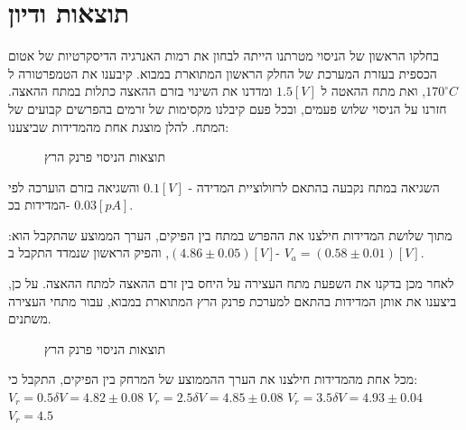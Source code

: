 \documentclass{article}
\begin{document}
\section{תוצאות ודיון}
בחלקו הראשון של הניסוי מטרתנו הייתה לבחון את רמות האנרגיה הדיסקרטיות של אטום הכספית בעזרת המערכת של החלק הראשון המתוארת במבוא.
קיבענו את הטמפרטורה ל
$170 ^{\circ} C$,
ואת מתח ההאטה ל
$1.5 [V]$
ומדדנו את השינוי בזרם ההאצה כתלות במתח ההאצה.
חזרנו על הניסוי שלוש פעמים, ובכל פעם קיבלנו מקסימות של זרמים בהפרשים קבועים של המתח.
להלן מוצגת אחת מהמדידות שביצענו:
 
\begin{figure}[H]
	\begin{center}
	\resizebox{\textwidth}{!}{}
	\end{center}
	\caption{תוצאות הניסוי פרנק הרץ}
	\label{fig:first_mesurment}
\end{figure}

השגיאה במתח נקבעה בהתאם לרזולוציית המדידה - 
$0.1 [V]$
והשגיאה בזרם הוערכה לפי המדידות בכ- 
$0.03 [pA]$.


מתוך שלושת המדידות חילצנו את ההפרש במתח בין הפיקים, הערך הממוצע שהתקבל הוא:
$(4.86 \pm 0.05)[V]$,
והפיק הראשון שנמדד התקבל ב- 
$V_a = (0.58 \pm 0.01)[V]$.


לאחר מכן בדקנו את השפעת מתח העצירה על היחס בין זרם ההאצה למתח ההאצה.
על כן, ביצענו את אותן המדידות בהתאם למערכת פרנק הרץ המתוארת במבוא, עבור מתחי העצירה משתנים.

\begin{figure}[H]
	\begin{center}
	\resizebox{\textwidth}{!}{}
	\end{center}
	\caption{תוצאות הניסוי פרנק הרץ}
	\label{fig:first_mesurment}
\end{figure}

מכל אחת מהמדידות חילצנו את הערך ההממוצע של המרחק בין הפיקים, התקבל כי:
$V_r=0.5 \delta V =4.82 \pm 0.08$
$V_r=2.5 \delta V =4.85 \pm 0.08$
$V_r=3.5 \delta V =4.93 \pm 0.04$
$V_r=4.5 $



\end{document}
